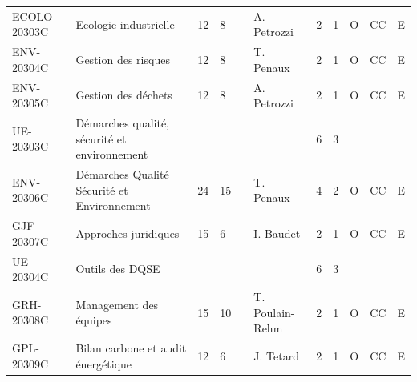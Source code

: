 \documentclass[a4paper,11pt]{article}
\begin{document}
{{\begin{tabular}{lllllllllll}
ECOLO-20303C                       & Ecologie industrielle                                             & 12 & 8  &                           & A. Petrozzi                        & 2    & 1    & O           & CC                                    & E                         \\
ENV-20304C                         & Gestion des risques                                               & 12 & 8  &                           & T. Penaux                          & 2    & 1    & O           & CC                                    & E                         \\
ENV-20305C                         & Gestion des déchets                                               & 12 & 8  &                           & A. Petrozzi                        & 2    & 1    & O           & CC                                    & E                         \\
\rowcolor[HTML]{EFEFEF} 
UE-20303C                          & Démarches qualité, sécurité et environnement                      &    &    &                           &                                    & 6    & 3    &             &                                       &                           \\
ENV-20306C                         & Démarches Qualité Sécurité et Environnement                       & 24 & 15 &                           & T. Penaux                          & 4    & 2    & O           & CC                                    & E                         \\
GJF-20307C                         & Approches juridiques                                              & 15 & 6  &                           & I. Baudet                          & 2    & 1    & O           & CC                                    & E                         \\
\rowcolor[HTML]{EFEFEF} 
UE-20304C                          & Outils des DQSE                                                   &    &    &                           &                                    & 6    & 3    &             &                                       &                           \\
GRH-20308C                         & Management des équipes                                            & 15 & 10 &                           & T. Poulain-Rehm                    & 2    & 1    & O           & CC                                    & E                         \\
GPL-20309C                         & Bilan carbone et audit énergétique                                & 12 & 6  &                           & J. Tetard                          & 2    & 1    & O           & CC                                    & E                         \\

\end{tabular}}}
\end{document}
